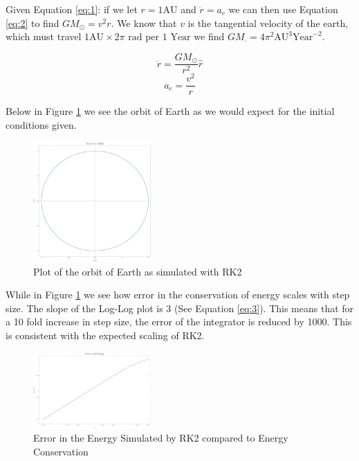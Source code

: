 \documentclass{article}
\begin{document}
\bigskip
{}
\medskip


Given Equation \ref{eq:1}: if we let 
$ r = 1 \text{AU} $ 
and 
$ \ddot{r} = a_c $
we can then use Equation \ref{eq:2} to find 
$ GM_{\odot} = v^2r $.
We know that 
$ v $
is the tangential velocity of the earth, which must travel
$ 1 \text{AU} \times 2\pi \text{ rad} $
per 
$ 1 \text{ Year} $
we find 
$ GM_{\cdot} = 4\pi^2 \text{AU}^3\text{Year}^{-2} $.


\begin{equation}\label{eq:1}
	\ddot{r} = \frac{GM_{\odot}}{r^2}\hat{r}
\end{equation}
\begin{equation}\label{eq:2}
	a_c = \frac{v^2}{r}
\end{equation}


\bigskip
{}
\medskip

Below in Figure \ref{fig:qual} we see the orbit of Earth as we would expect for the initial conditions given.

\begin{figure}[h]
	\begin{center}
		\includegraphics[width=0.4\textwidth]{qual.pdf}
	\end{center}
	\caption{Plot of the orbit of Earth as simulated with RK2}
\label{fig:qual}
\end{figure}

While in Figure \ref{fig:qual} we see how error in the conservation of energy scales with step size. The slope of the Log-Log plot is 3 (See Equation \ref{eq:3}).
This means that for a 10 fold increase in step size, the error of the integrator is reduced by 1000. This is consistent with the expected scaling of RK2.

\begin{figure}[h]
	\begin{center}
		\includegraphics[width=0.4\textwidth]{error.pdf}
	\end{center}
	\caption{Error in the Energy Simulated by RK2 compared to Energy Conservation}
\label{fig:error}
\end{figure}
\end{document}
